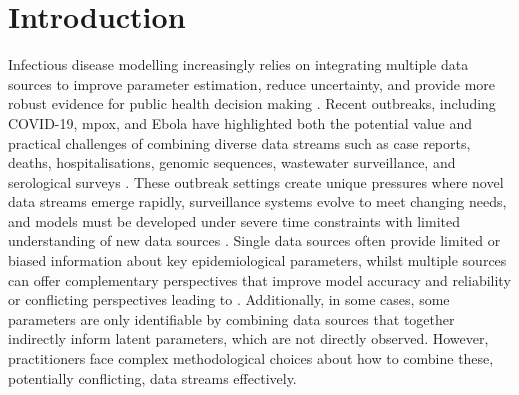 \documentclass{article}
\begin{document}
\section{Introduction}

Infectious disease modelling increasingly relies on integrating multiple data sources to improve parameter estimation, reduce uncertainty, and provide more robust evidence for public health decision making \citep{deangelis2018analysing}.
Recent outbreaks, including COVID-19, mpox, and Ebola have highlighted both the potential value and practical challenges of combining diverse data streams such as case reports, deaths, hospitalisations, genomic sequences, wastewater surveillance, and serological surveys \citep{knock2021key, ro2025estimating, Abbott2021-delta, Abbott2022-prevalence, Ward2024-sp}.
These outbreak settings create unique pressures where novel data streams emerge rapidly, surveillance systems evolve to meet changing needs, and models must be developed under severe time constraints with limited understanding of new data sources \citep{mccaw2023role}.
Single data sources often provide limited or biased information about key epidemiological parameters, whilst multiple sources can offer complementary perspectives that improve model accuracy and reliability or conflicting perspectives leading to  \citep{lison2024generative, sherratt2021exploring}.
Additionally, in some cases, some parameters are only identifiable by combining data sources that together indirectly inform latent parameters, which are not directly observed.
However, practitioners face complex methodological choices about how to combine these, potentially conflicting, data streams effectively.
\end{document}

